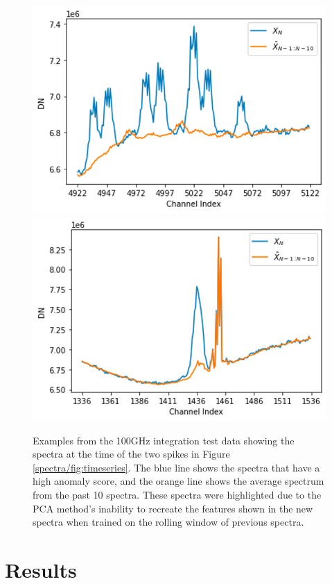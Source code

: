 \begin{figure}[t]
    \centering
    \includegraphics[width=0.49\linewidth]{figs/spectra/pca1.png}
    \includegraphics[width=0.49\linewidth]{figs/spectra/pca2.png}
    \caption[Novel Examples from the 100GHz Integration Test]{Examples from the 100GHz integration test data showing the spectra at the time of the two spikes in Figure \ref{spectra/fig:timeseries}. The blue line shows the spectra that have a high anomaly score, and the orange line shows the average spectrum from the past 10 spectra. These spectra were highlighted due to the PCA method's inability to recreate the features shown in the new spectra when trained on the rolling window of previous spectra.}
    \label{spectra/fig:100ghz}
\end{figure}

\section{Results}
\label{spectra/sec:results}

